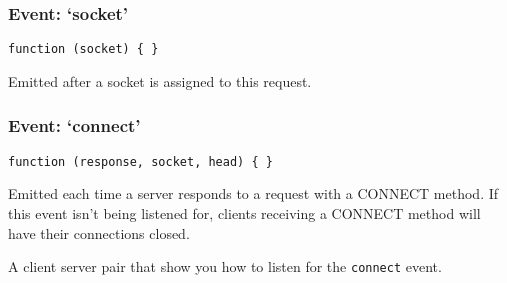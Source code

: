 \subsubsection{\texorpdfstring{Event:
`socket'}{Event: socket}}\label{event-socket}

\texttt{function\ (socket)\ \{\ \}}

Emitted after a socket is assigned to this request.

\subsubsection{\texorpdfstring{Event:
`connect'}{Event: connect}}\label{event-connect-1}

\texttt{function\ (response,\ socket,\ head)\ \{\ \}}

Emitted each time a server responds to a request with a CONNECT method.
If this event isn't being listened for, clients receiving a CONNECT
method will have their connections closed.

A client server pair that show you how to listen for the
\texttt{connect} event.

